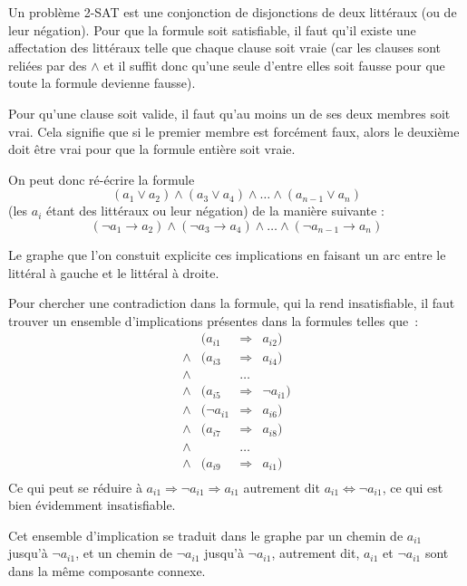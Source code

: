 \documentclass{article}
\begin{document}
Un problème 2-SAT est une conjonction de disjonctions de deux littéraux (ou de leur négation). Pour que la formule soit satisfiable, il faut
qu'il existe une affectation des littéraux telle que chaque clause soit vraie (car les clauses sont reliées par des $\wedge$ et il suffit
donc qu'une seule d'entre elles soit fausse pour que toute la formule devienne fausse).

Pour qu'une clause soit valide, il faut qu'au moins un de ses deux membres soit vrai. Cela signifie que si le premier membre est forcément
faux, alors le deuxième doit être vrai pour que la formule entière soit vraie.

On peut donc ré-écrire la formule
$$(a_1 \vee a_2) \wedge (a_3 \vee a_4) \wedge \dots \wedge (a_{n-1} \vee a_n)$$
(les $a_i$ étant des littéraux ou leur négation) de la manière suivante :
$$(\lnot a_1 \rightarrow a_2) \wedge (\lnot a_3 \rightarrow a_4) \wedge \dots \wedge (\lnot a_{n-1} \rightarrow a_n)$$

Le graphe que l'on constuit explicite ces implications en faisant un arc entre le littéral à gauche et le littéral à droite.

Pour chercher une contradiction dans la formule, qui la rend insatisfiable, il faut trouver un ensemble d'implications présentes dans la
formules telles que~:
$$
\begin{array}{rrcl}
       & (a_{i1} & \Rightarrow & a_{i2}) \\
  \wedge & (a_{i3} & \Rightarrow & a_{i4}) \\
  \wedge & & \dots & \\
  \wedge & (a_{i5} & \Rightarrow & \lnot a_{i1}) \\
  \wedge & (\lnot a_{i1} & \Rightarrow & a_{i6}) \\
  \wedge & (a_{i7} & \Rightarrow & a_{i8}) \\
  \wedge & & \dots & \\
  \wedge & (a_{i9} & \Rightarrow & a_{i1}) \\
\end{array}
$$
Ce qui peut se réduire à $a_{i1} \Rightarrow \lnot a_{i1} \Rightarrow a_{i1}$ autrement dit $a_{i1} \Leftrightarrow \lnot a_{i1}$, ce qui
est bien évidemment insatisfiable.

Cet ensemble d'implication se traduit dans le graphe par un chemin de $a_{i1}$ jusqu'à $\lnot a_{i1}$, et un chemin de $\lnot a_{i1}$
jusqu'à $\lnot a_{i1}$, autrement dit, $a_{i1}$ et $\lnot a_{i1}$ sont dans la même composante connexe.
\end{document}
